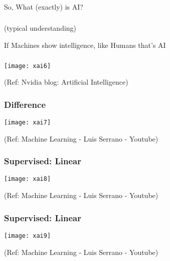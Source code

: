 \begin{frame}[fragile]\frametitle{}
\begin{center}
{\Large So, What (exactly) is AI?}
\end{center}
\end{frame}

\begin{frame}[fragile]\frametitle{}
\begin{center}
(typical understanding)

{\Huge If Machines show intelligence, like Humans that's AI}
\end{center}
\end{frame}

\begin{frame}[fragile]\frametitle{}
\begin{center}
\texttt{[image: xai6]}
\end{center}

\tiny{(Ref: Nvidia blog: Artificial Intelligence)}
\end{frame}

\begin{frame}[fragile]\frametitle{Difference}
\begin{center}
\texttt{[image: xai7]}
\end{center}

\tiny{(Ref: Machine Learning - Luis Serrano - Youtube)}
\end{frame}

\begin{frame}[fragile]\frametitle{Supervised: Linear}
\begin{center}
\texttt{[image: xai8]}
\end{center}

\tiny{(Ref: Machine Learning - Luis Serrano - Youtube)}
\end{frame}

\begin{frame}[fragile]\frametitle{Supervised: Linear}
\begin{center}
\texttt{[image: xai9]}
\end{center}

\tiny{(Ref: Machine Learning - Luis Serrano - Youtube)}
\end{frame}

